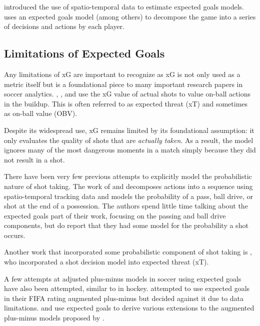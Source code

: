 \documentclass[12pt,letterpaper]{article}
\begin{document}
\cite{lucey2015quality} introduced the use of spatio-temporal data to estimate expected goals models. \cite{fernandez2019decomposing} uses an expected goals model (among others) to decompose the game into a series of decisions and actions by each player.

\subsection{Limitations of Expected Goals}


Any limitations of xG are important to recognize as xG is not only used as a metric itself but is a foundational piece to many important research papers in soccer analytics. \cite{singh_xT_blog}, \cite{bransen2018measuring}, and \cite{statsbomb2021obv} use the xG value of actual shots to value on-ball actions in the buildup. This is often referred to as expected threat (xT) and sometimes as on-ball value (OBV).

Despite its widespread use, xG remains limited by its foundational assumption: it only evaluates the quality of shots that are \emph{actually taken}. As a result, the model ignores many of the most dangerous moments in a match simply because they did not result in a shot.


There have been very few previous attempts to explicitly model the probabilistic nature of shot taking. The work of \cite{fernandez2019decomposing} and \cite{fernandez2021framework} decomposes actions into a sequence using spatio-temporal tracking data and models the probability of a pass, ball drive, or shot at the end of a possession. The authors spend little time talking about the expected goals part of their work, focusing on the passing and ball drive components, but do report that they had some model for the probability a shot occurs.

Another work that incorporated some probabilistic component of shot taking is  \cite{poropudas2021extended}, who incorporated a shot decision model into expected threat (xT).


A few attempts at adjusted plus-minus models in soccer using expected goals have also been attempted, similar to \cite{macdonald2012expected} in hockey. \cite{matano2018augmenting} attempted to use expected goals in their FIFA rating augmented plus-minus but decided against it due to data limitations. \cite{kharrat2020plus} and \cite{zhang2022cmsac} use expected goals to derive various extensions to the augmented plus-minus models proposed by \cite{macdonald2012expected}. 
\end{document}
